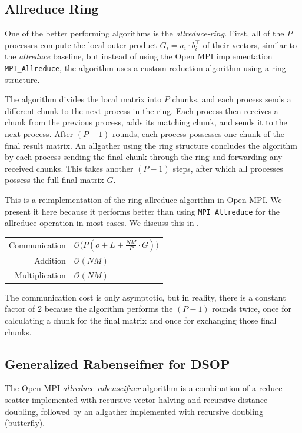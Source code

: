 \documentclass[letterpaper]{article}
\newcommand{\code}{\textit}
\begin{document}
\subsection{Allreduce Ring} \label{allreduce-ring}
One of the better performing algorithms is the \code{allreduce-ring}. First, all of the $P$ processes compute the local outer product $G_i = a_i \cdot b_{i}^{\top}$ of their vectors, similar to the \code{allreduce} baseline, but instead of using the Open MPI implementation \verb|MPI_Allreduce|, the algorithm uses a custom reduction algorithm using a ring structure.

The algorithm divides the local matrix into $P$ chunks, and each process sends a different chunk to the next process in the ring. Each process then receives a chunk from the previous process, adds its matching chunk, and sends it to the next process. After $(P-1)$ rounds, each process possesses one chunk of the final result matrix. An allgather using the ring structure concludes the algorithm by each process sending the final chunk through the ring and forwarding any received chunks. This takes another $(P-1)$ steps, after which all processes possess the full final matrix $G$.

This is a reimplementation of the ring allreduce algorithm in Open MPI. We present it here because it performs better than using \verb|MPI_Allreduce| for the allreduce operation in most cases. We discuss this in .

\begin{tabular}{r l}
    Communication   &   $\mathcal{O}\big(P \left(o + L + \frac{NM}{P}\cdot G \right)\big)$ \\
    Addition        &   $\mathcal{O}(NM)$ \\
    Multiplication  &   $\mathcal{O}(NM)$
\end{tabular}

The communication cost is only asymptotic, but in reality, there is a constant factor of $2$ because the algorithm performs the $(P - 1)$ rounds twice, once for calculating a chunk for the final matrix and once for exchanging those final chunks.

\subsection{Generalized Rabenseifner for DSOP}\label{sec:grabenseifner}
The Open MPI \code{allreduce-rabenseifner} algorithm is a combination of a reduce-scatter implemented with recursive vector halving and recursive distance doubling, followed by an allgather implemented with recursive doubling (butterfly). \cite{Rabenseifner:05}
\end{document}
